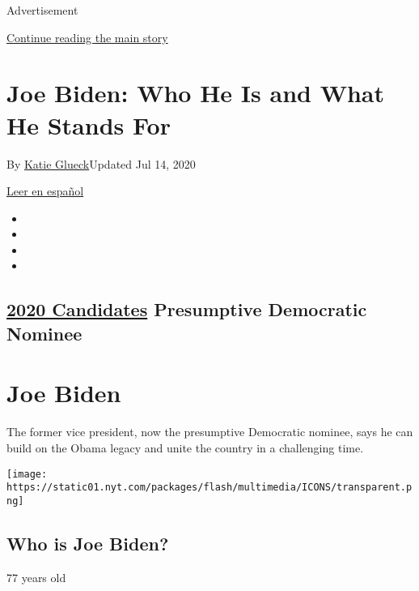 Advertisement

\protect\hyperlink{after-top}{Continue reading the main story}

\hypertarget{joe-biden-who-he-is-and-what-he-stands-for}{%
\section{Joe Biden: Who He Is and What He Stands
For}\label{joe-biden-who-he-is-and-what-he-stands-for}}

By \href{https://www.nytimes.com/by/katie-glueck}{Katie Glueck}Updated
Jul 14, 2020

\href{https://www.nytimes.com/es/interactive/2020/espanol/estados-unidos/joe-biden-elecciones.html}{Leer
en español}

\begin{itemize}
\item
\item
\item
\item
\end{itemize}

\hypertarget{2020-candidates--presumptive-democratic-nominee-}{%
\subsection{\texorpdfstring{\href{https://www.nytimes.com/interactive/2019/us/politics/2020-presidential-candidates.html}{2020
Candidates} Presumptive Democratic Nominee
}{2020 Candidates  Presumptive Democratic Nominee }}\label{2020-candidates--presumptive-democratic-nominee-}}

\hypertarget{joe-biden}{%
\section{Joe Biden}\label{joe-biden}}

The former vice president, now the presumptive Democratic nominee, says
he can build on the Obama legacy and unite the country in a challenging
time.

\texttt{[image: https://static01.nyt.com/packages/flash/multimedia/ICONS/transparent.png]}

\hypertarget{who-is-joe-biden}{%
\subsection{Who is Joe Biden?}\label{who-is-joe-biden}}

77 years old

